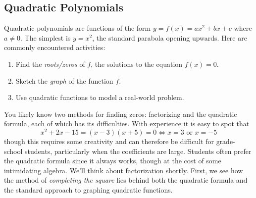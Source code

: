 \clearpage



\subsection{Quadratic Polynomials}

Quadratic polynomials are functions of the form $y=f(x)=ax^2+bx+c$ where $a\neq 0$. The simplest is $y=x^2$, the standard parabola opening upwards. Here are commonly encountered activities:
\begin{enumerate}\itemsep0pt
  \item Find the \emph{roots/zeros} of $f$, the solutions to the equation $f(x)=0$.
  \item Sketch the \emph{graph} of the function $f$.
  \item Use quadratic functions to model a real-world problem.
\end{enumerate}

You likely know two methods for finding zeros: factorizing and the quadratic formula, each of which has its difficulties. With experience it is easy to spot that 
\[x^2+2x-15=(x-3)(x+5)=0\iff x=3\text{ or }x=-5\]
though this requires some creativity and can therefore be difficult for grade-school students, particularly when the coefficients are large. Students often prefer the quadratic formula since it always works, though at the cost of some intimidating algebra.
We'll think about factorization shortly. First, we see how the method of \emph{completing the square} lies behind both the quadratic formula and the standard approach to graphing quadratic functions.


